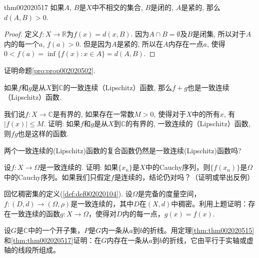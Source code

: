 \begin{theorem}{}{thm002020517}
如果$A$, $B$是$X$中不相交的集合, $B$是闭的, $A$是紧的, 那么$d(A, B) > 0$. 
\end{theorem}

\begin{proof}
定义$f: X \to \mathbb{R}$为$f(x) = d(x, B)$. 因为$A \cap B = \emptyset$及$B$是闭集, 所以对于$A$内的每一个$a$, $f(a) > 0$. 但是因为$A$是紧的, 所以在$A$内存在一点$a$, 使得$0 < f(a) = \inf\{f(x): x \in A\} = d(A, B)$. 
\end{proof}

\begin{exercise}
证明命题\ref{pro:prop002020502}. 
\end{exercise}

\begin{exercise}
如果$f$和$g$是从$X$到$\mathbb{C}$的一致连续（Lipschitz）函数, 那么$f+g$也是一致连续（Lipschitz）函数. 
\end{exercise}

\begin{exercise}\label{exer002020503}
我们说$f:X \to \mathbb{C}$是有界的, 如果存在一常数$M > 0$, 使得对于$X$中的所有$x$, 有$|f(x)| \le M$. 证明: 如果$f$和$g$是从$X$到$\mathbb{C}$的有界的, 一致连续的（Lipschitz）函数, 则$fg$也是这样的函数.
\end{exercise}

\begin{exercise}
两个一致连续的(Lipschitz)函数的复合函数仍然是一致连续(Lipschitz)函数吗?
\end{exercise}

\begin{exercise}
设$f:X \to \Omega$是一致连续的. 证明: 如果$\{x_n\}$是$X$中的Cauchy序列，则$\{f(x_n)\}$是$\Omega$中的Cauchy序列。如果我们只假定$f$是连续的，结论仍对吗？（证明或举出反例）
\end{exercise}

\begin{exercise}\label{exer002020506}
回忆稠密集的定义(\ref{def:def002020104}). 设$\Omega$是完备的度量空间，$f: (D, d) \to (\Omega,\rho)$是一致连续的，其中$D$在$(X, d)$中稠密。利用上题证明：存在一致连续的函数$g:X \to \Omega$，使得对$D$内的每一点，$g(x)=f(x)$.
\end{exercise}

\begin{exercise}\label{exer002020507}
设$G$是$\mathbb{C}$中的一个开子集，$P$是$G$内一条从$a$到$b$的折线。用定理\ref{thm:thm002020515}和\ref{thm:thm002020517}证明：在$G$内存在一条从$a$到$b$的折线，它由平行于实轴或虚轴的线段所组成。
\end{exercise}

